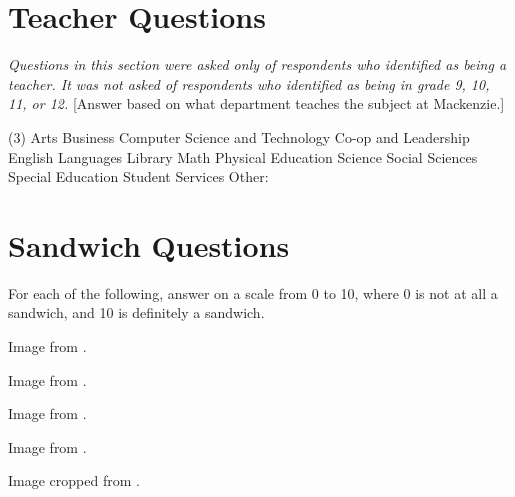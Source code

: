 \section{Teacher Questions}
	\textit{Questions in this section were asked only of respondents who identified as being a teacher.
	It was not asked of respondents who identified as being in grade 9, 10, 11, or 12.}
	[Answer based on what department teaches the subject at Mackenzie.]
	\begin{multiplechoice}(3)
		\choice Arts
		\choice Business
		\choice Computer Science and Technology
		\choice Co-op and Leadership
		\choice English
		\choice Languages
		\choice Library
		\choice Math
		\choice Physical Education
		\choice Science
		\choice Social Sciences
		\choice Special Education
		\choice Student Services
		\choice Other: \blank
	\end{multiplechoice}

\section{Sandwich Questions}
	For each of the following, answer on a scale from 0 to 10, where 0 is not at all a sandwich, and 10 is definitely a sandwich.

	\begin{minipage}{\textwidth}
		Image from \cite{hamSandwich}.
	\end{minipage}

	\begin{minipage}{\textwidth}
		Image from \cite{bltSandwich}.
	\end{minipage}

	\begin{minipage}{\textwidth}
		Image from \cite{grilledCheese}.
	\end{minipage}

	\begin{minipage}{\textwidth}
		Image from \cite{panini}.
	\end{minipage}

	\begin{minipage}{\textwidth}
		Image cropped from \cite{subSandwich}.
	\end{minipage}

